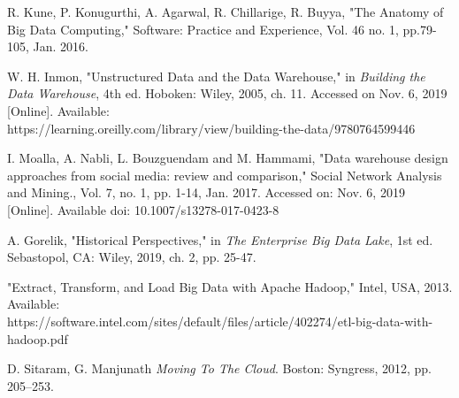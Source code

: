 \documentclass[journal]{IEEEtran}
\begin{document}
	\begin{thebibliography}{1}
		
		R. Kune, P. Konugurthi, A. Agarwal, R. Chillarige, R. Buyya,
		"The Anatomy of Big Data Computing," Software: Practice and Experience,
		Vol. 46 no. 1, pp.79-105, Jan. 2016. 
		
		W. H. Inmon, "Unstructured Data and the Data Warehouse," in 
		\emph{Building the Data Warehouse},
		4th ed. Hoboken: Wiley, 2005, ch. 11.
		Accessed on Nov. 6, 2019 [Online]. 
		Available: \\ https://learning.oreilly.com/library/view/building-the-data/9780764599446
		
		I. Moalla, A. Nabli, L. Bouzguendam and M. Hammami,
		"Data warehouse design approaches from social media: review and comparison,"
		Social Network Analysis and Mining., Vol. 7, no. 1, pp. 1-14, Jan. 2017.
		Accessed on: Nov. 6, 2019 [Online]. 
		Available doi: 10.1007/s13278-017-0423-8
		
		A. Gorelik, "Historical Perspectives," in 
		\emph{The Enterprise Big Data Lake},
		1st ed. Sebastopol, CA: Wiley, 2019, ch. 2, pp. 25-47.
		
		"Extract, Transform, and Load Big Data with Apache Hadoop," Intel, USA, 2013.
		Available:\\ https://software.intel.com/sites/default/files/article/402274/etl-big-data-with-hadoop.pdf
		
		D. Sitaram, G. Manjunath \textit{Moving To The Cloud}. Boston: Syngress, 2012, pp. 205–253.
		
	\end{thebibliography}
	
	
\end{document}
